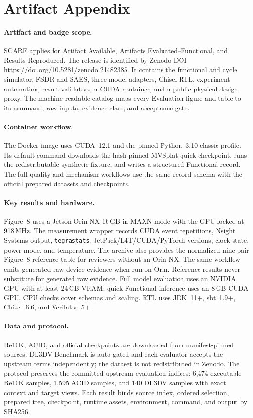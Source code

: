 \appendix
\section{Artifact Appendix}

\paragraph{Artifact and badge scope.}
SCARF applies for Artifact Available, Artifacts Evaluated--Functional, and
Results Reproduced. The release is identified by Zenodo DOI
\url{https://doi.org/10.5281/zenodo.21482385}. It contains the functional and
cycle simulator, FSDR and SAES, three model adapters, Chisel RTL, experiment
automation, result validators, a CUDA container, and a public physical-design
proxy. The machine-readable catalog maps every Evaluation figure and table to
its command, raw inputs, evidence class, and acceptance gate.

\paragraph{Container workflow.}
The Docker image uses CUDA~12.1 and the pinned Python~3.10 classic profile.
Its default command downloads the hash-pinned MVSplat quick checkpoint, runs
the redistributable synthetic fixture, and writes a structured Functional
record. The full quality and mechanism workflows use the same record schema
with the official prepared datasets and checkpoints.

\paragraph{Key results and hardware.}
Figure~8 uses a Jetson Orin NX 16\,GB in MAXN mode with the GPU locked at
918\,MHz. The measurement wrapper records CUDA event repetitions, Nsight
Systems output, \texttt{tegrastats}, JetPack/L4T/CUDA/PyTorch versions, clock
state, power mode, and temperature. The archive also provides the normalized
nine-pair Figure~8 reference table for reviewers without an Orin NX. The same
workflow emits generated raw device evidence when run on Orin. Reference
results never substitute for generated raw evidence. Full model evaluation
uses an NVIDIA GPU with at least 24\,GB VRAM; quick Functional inference uses
an 8\,GB CUDA GPU. CPU checks cover schemas and scaling. RTL uses JDK~11+,
sbt~1.9+, Chisel~6.6, and Verilator~5+.

\paragraph{Data and protocol.}
Re10K, ACID, and official checkpoints are downloaded from manifest-pinned
sources. DL3DV-Benchmark is auto-gated and each evaluator accepts the upstream
terms independently; the dataset is not redistributed in Zenodo. The protocol
preserves the committed upstream evaluation indices: 6,474 executable Re10K
samples, 1,595 ACID samples, and 140 DL3DV samples with exact context and
target views. Each result binds source index, ordered selection, prepared tree,
checkpoint, runtime assets, environment, command, and output by SHA256.

